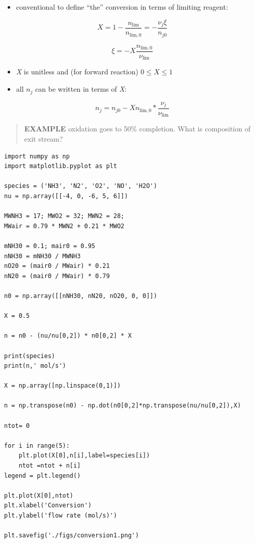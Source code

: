 \documentclass[11pt]{article}
\begin{document}
\begin{itemize}
\item conventional to define ``the'' conversion in terms of limiting reagent:
\end{itemize}

\[X = 1 - \frac{n_{\text{lim}}}{n_{\text{lim},0}} = -\frac{\nu_{j}\xi}{n_{j0}} \]

\[ \xi = -X \frac{n_{\text{lim},0}}{\nu_{\text{lim}}} \]

\begin{itemize}
\item \emph{X} is unitless and (for forward reaction) \( 0 \le X \le 1\)
\item all \(n_{j}\) can be written in terms of \emph{X}:
\end{itemize}

\[n_{j} = n_{j0} - X n_{\text{lim},0} * \frac{\nu_{j}}{\nu_{\text{lim}}}\]

\begin{quote}
\hline
\textbf{EXAMPLE}  oxidation goes to 50\% completion.  What is composition of exit stream?
\hline
\end{quote}

\begin{verbatim}
import numpy as np
import matplotlib.pyplot as plt

species = ('NH3', 'N2', 'O2', 'NO', 'H2O')
nu = np.array([[-4, 0, -6, 5, 6]])

MWNH3 = 17; MWO2 = 32; MWN2 = 28;
MWair = 0.79 * MWN2 + 0.21 * MWO2

mNH30 = 0.1; mair0 = 0.95
nNH30 = mNH30 / MWNH3
nO20 = (mair0 / MWair) * 0.21
nN20 = (mair0 / MWair) * 0.79

n0 = np.array([[nNH30, nN20, nO20, 0, 0]])

X = 0.5

n = n0 - (nu/nu[0,2]) * n0[0,2] * X

print(species)
print(n,' mol/s')

X = np.array([np.linspace(0,1)])

n = np.transpose(n0) - np.dot(n0[0,2]*np.transpose(nu/nu[0,2]),X)

ntot= 0

for i in range(5):
    plt.plot(X[0],n[i],label=species[i])
    ntot =ntot + n[i]
legend = plt.legend()

plt.plot(X[0],ntot)
plt.xlabel('Conversion')
plt.ylabel('flow rate (mol/s)')

plt.savefig('./figs/conversion1.png')
\end{verbatim}
\end{document}
